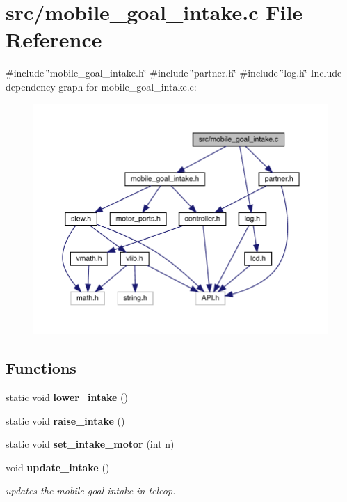 \section{src/mobile\+\_\+goal\+\_\+intake.c File Reference}
\label{mobile__goal__intake_8c}
{\ttfamily \#include \char`\"{}mobile\+\_\+goal\+\_\+intake.\+h\char`\"{}}\newline
{\ttfamily \#include \char`\"{}partner.\+h\char`\"{}}\newline
{\ttfamily \#include \char`\"{}log.\+h\char`\"{}}\newline
Include dependency graph for mobile\+\_\+goal\+\_\+intake.\+c\+:
\nopagebreak
\begin{figure}[H]
\begin{center}
\leavevmode
\includegraphics[width=350pt]{mobile__goal__intake_8c__incl}
\end{center}
\end{figure}
\subsection*{Functions}
\begin{DoxyCompactItemize}
\item 
static void \textbf{ lower\+\_\+intake} ()
\item 
static void \textbf{ raise\+\_\+intake} ()
\item 
static void \textbf{ set\+\_\+intake\+\_\+motor} (int n)
\item 
void \textbf{ update\+\_\+intake} ()
\begin{DoxyCompactList}\small\item\em updates the mobile goal intake in teleop. \end{DoxyCompactList}\end{DoxyCompactItemize}


